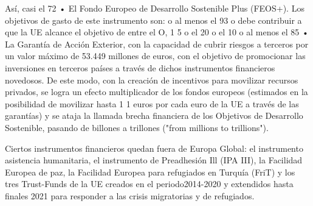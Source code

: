 \documentclass[10pt,a4paper]{article}
\begin{document}
{Así, casi el 72%
• El Fondo Europeo de Desarrollo Sostenible Plus (FEOS+). Los objetivos de gasto de este instrumento son:
o al menos el 93%
o debe contribuir a que la UE alcance el objetivo de entre el O, 1 5%
o el 20%
o el 10%
o al menos el 85%
• La Garantía de Acción Exterior, con la capacidad de cubrir riesgos a terceros por un valor máximo de 53.449 millones de euros, con el objetivo de promocionar las inversiones en terceros países a través de dichos instrumentos financieros novedosos. De este modo, con la creación de incentivos para movilizar recursos privados, se logra un efecto multiplicador de los fondos europeos (estimados en la posibilidad de movilizar hasta 1 1 euros por cada euro de la UE a través de las garantías) y se ataja la llamada brecha financiera de los Objetivos de Desarrollo Sostenible, pasando de billones a trillones ("from millions to trillions"). 

Ciertos instrumentos financieros quedan fuera de Europa Global: el instrumento asistencia humanitaria, el instrumento de Preadhesión Ill (IPA III), la Facilidad Europea de paz, la Facilidad Europea para refugiados en Turquía (FriT) y los tres Trust-Funds de la UE creados en el periodo2014-2020 y extendidos hasta finales 2021 para responder a las crisis migratorias y de refugiados.


}
\end{document}
